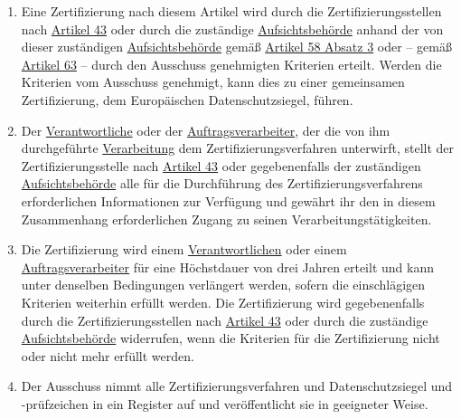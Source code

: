 \begin{enumerate}
  \item Eine Zertifizierung nach diesem Artikel wird durch die Zertifizierungsstellen nach \hyperref[ch:43]{Artikel 43}
   oder durch die zuständige \hyperref[itm:04-21]{Aufsichtsbehörde} anhand der von dieser zuständigen \hyperref
   [itm:04-21]{Aufsichtsbehörde} gemäß \hyperref[itm:58-3]{Artikel 58 Absatz 3} oder -- gemäß \hyperref[ch:63]
   {Artikel 63} -- durch den Ausschuss genehmigten Kriterien erteilt. Werden die Kriterien vom Ausschuss genehmigt,
   kann dies zu einer gemeinsamen Zertifizierung, dem Europäischen Datenschutzsiegel, führen.%
  \label{itm:42-5}

  \item Der \hyperref[itm:04-7]{Verantwortliche} oder der \hyperref[itm:04-8]{Auftragsverarbeiter}, der die von ihm
   durchgeführte \hyperref[itm:04-2]{Verarbeitung} dem Zertifizierungsverfahren unterwirft, stellt der
   Zertifizierungsstelle nach \hyperref[ch:43]{Artikel 43} oder gegebenenfalls der zuständigen \hyperref[itm:04-21]
   {Aufsichtsbehörde} alle für die Durchführung des Zertifizierungsverfahrens erforderlichen Informationen zur
   Verfügung und gewährt ihr den in diesem Zusammenhang erforderlichen Zugang zu seinen Verarbeitungstätigkeiten.%
  \label{itm:42-6}

  \item Die Zertifizierung wird einem \hyperref[itm:04-7]{Verantwortlichen} oder einem \hyperref[itm:04-8]
   {Auftragsverarbeiter} für eine Höchstdauer von drei Jahren erteilt und kann unter denselben Bedingungen verlängert
   werden, sofern die einschlägigen Kriterien weiterhin erfüllt werden. Die Zertifizierung wird gegebenenfalls
   durch die Zertifizierungsstellen nach \hyperref[ch:43]{Artikel 43} oder durch die zuständige \hyperref[itm:04-21]
   {Aufsichtsbehörde} widerrufen, wenn die Kriterien für die Zertifizierung nicht oder nicht mehr erfüllt
   werden.%
  \label{itm:42-7}

  \item Der Ausschuss nimmt alle Zertifizierungsverfahren und Datenschutzsiegel und -prüfzeichen in ein Register auf und
   veröffentlicht sie in geeigneter Weise.%
  \label{itm:42-8}

\end{enumerate}


